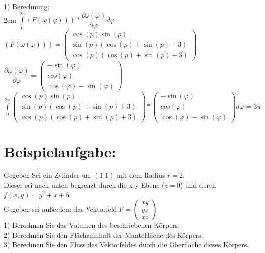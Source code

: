 \documentclass[11pt,final]{scrreprt}
\begin{document}
1) Berechnung:\\

\begingroup
\leftskip2em 
$ \int\limits_0^{2\pi} (F(\omega(\varphi))) * \dfrac{\partial\omega(\varphi)}{\partial\varphi} d\varphi $\\
$ (F(\omega(\varphi))) = \left(\begin{matrix}
\cos(p)\sin(p)\\\sin(p)(\cos(p) + \sin(p) + 3)\\\cos(p)(\cos(p) + \sin(p) + 3)
\end{matrix}\right) $\\
$ \dfrac{\partial\omega(\varphi)}{\partial\varphi} = \left(\begin{matrix}
-\sin(\varphi)\\cos(\varphi)\\\cos(\varphi)-\sin(\varphi)
\end{matrix}\right)$\\
$ \int\limits_0^{2\pi} \left(\begin{matrix}
\cos(p)\sin(p)\\\sin(p)(\cos(p) + \sin(p) + 3)\\\cos(p)(\cos(p) + \sin(p) + 3)
\end{matrix}\right) * \left(\begin{matrix}
-\sin(\varphi)\\cos(\varphi)\\\cos(\varphi)-\sin(\varphi)
\end{matrix}\right) d\varphi = 3\pi$\\
\par	
\endgroup

\section{Beispielaufgabe:}

Gegeben Sei ein Zylinder um $(1|1)$ mit dem Radius $r=2$.\\
Dieser sei nach unten begrenzt durch die x-y-Ebene ($z=0$) und durch $f(x, y)=y^2+x+5$.\\
Gegeben sei außerdem das Vektorfeld $ F = \left(\begin{matrix}
xy\\ yz\\ xz
\end{matrix}\right) $\\

1) Berechnen Sie das Volumen des beschriebenen Körpers.\\
2) Berechnen Sie den Flächeninhalt der Mantelfläche des Körpers.\\
3) Berechnen Sie den Fluss des Vektorfeldes durch die Oberfläche dieses Körpers.
\end{document}
